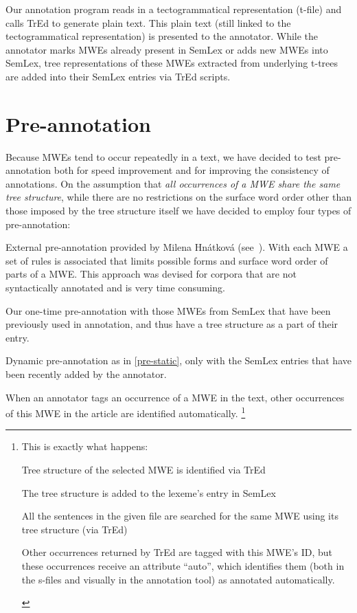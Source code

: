 Our annotation program reads in a tectogrammatical representation (t-file) and calls TrEd \citep{pajas:tred} to generate plain text. This plain text (still linked to the tectogrammatical representation) is presented to the annotator. While the annotator marks MWEs already present in SemLex or adds new MWEs into SemLex, tree representations of these MWEs extracted from underlying t-trees are added into their SemLex entries via TrEd scripts. 



\section{Pre-annotation}
\label{sec:annot:pre}
Because MWEs tend to occur repeatedly in a text, we have decided to test pre-annotation both for speed improvement and for improving the consistency of annotations. 
On the assumption that \emph{all occurrences of a MWE share the same tree structure}, while there are no restrictions on the surface word order other than those imposed by the tree structure itself
%
we have decided to employ four types of pre-annotation:

\begin{asparaenum}[A)]
\item \label{pre-hnatkova}External pre-annotation provided by Milena Hnátková (see~\citealp{hnatkova:2002}). With each MWE a set of rules is associated that limits possible forms and surface word order of parts of a MWE. This approach was devised for corpora that are not syntactically annotated and is very time consuming.
\item \label{pre-static}Our one-time pre-annotation with those MWEs from SemLex that have been previously used in annotation, and thus have a tree structure as a part of their entry.
\item \label{pre-on-load}Dynamic pre-annotation as in \ref{pre-static}, only with the SemLex entries that have been recently added by the annotator. 
\item \label{pre-on-annot}When an annotator tags an occurrence of a MWE in the text, other occurrences of this MWE in the article are identified automatically.%
%
\footnote{This is exactly what happens:
\begin{inparaenum}[1)]
\item Tree structure of the selected MWE is identified via TrEd
\item The tree structure is added to the lexeme's entry in SemLex
\item All the sentences in the given file are searched for the same MWE using its tree structure (via TrEd)
\item Other occurrences returned by TrEd are tagged with this MWE's ID, but these occurrences receive an attribute ``auto'', which identifies them (both in the s-files and visually in the annotation tool) as annotated automatically.
\end{inparaenum}
} %
\end{asparaenum}

